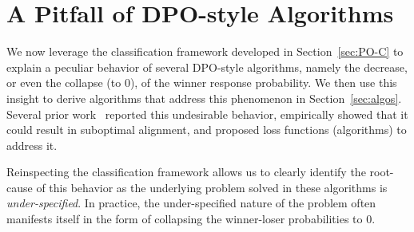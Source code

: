 \section{A Pitfall of DPO-style Algorithms}
\label{sec:DPO-Pitfall}

We now leverage the classification framework developed in Section~\ref{sec:PO-C} to explain a peculiar behavior of several DPO-style algorithms, namely the decrease, or even the collapse (to $0$), of the winner response probability. We then use this insight to derive algorithms that address this phenomenon in Section~\ref{sec:algos}. Several prior work~\cite{nemotron,ppo_vs_dpo,smaug,distilled_DPO,xiao2024caldpo} reported this undesirable behavior, empirically showed that it could result in suboptimal alignment, and proposed loss functions (algorithms) to address it.

Reinspecting the classification framework allows us to clearly identify the root-cause of this behavior as the underlying problem solved in these algorithms is {\em under-specified}. In practice, the under-specified nature of the problem often manifests itself in the form of collapsing the winner-loser probabilities to $0$. 

